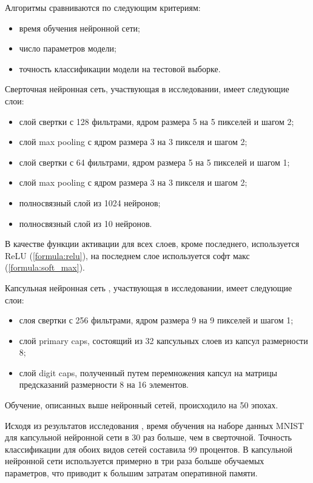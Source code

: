 Алгоритмы сравниваются по следующим критериям:
\begin{itemize}
	\item время обучения нейронной сети;
	\item число параметров модели;
	\item точность классификации модели на тестовой выборке.
\end{itemize}

Сверточная нейронная сеть, участвующая в исследовании, имеет следующие слои:
\begin{itemize}
	\item слой свертки с 128 фильтрами, ядром размера 5 на 5 пикселей и шагом 2;
	\item слой max pooling с ядром размера 3 на 3 пикселя и шагом 2;
	\item слой свертки с 64 фильтрами, ядром размера 5 на 5 пикселей и шагом 1;
	\item слой max pooling с ядром размера 3 на 3 пикселя и шагом 2;
	\item полносвязный слой из 1024 нейронов;
	\item полносвязный слой из 10 нейронов.
\end{itemize}
В качестве функции активации для всех слоев, кроме последнего, используется ReLU (\ref{formula:relu}), на последнем слое используется софт макс (\ref{formula:soft_max}).

Капсульная нейронная сеть , участвующая в исследовании, имеет следующие слои:
\begin{itemize}
	\item слоя свертки с 256 фильтрами, ядром размера 9 на 9 пикселей и шагом 1;
	\item слой primary caps, состоящий из 32 капсульных слоев из капсул размерности 8;
	\item слой digit caps, полученный путем перемножения капсул на матрицы предсказаний размерности 8 на 16 элементов.
\end{itemize}

Обучение, описанных выше нейронный сетей, происходило на 50 эпохах.

Исходя из результатов исследования \cite{comparising}, время обучения на наборе данных MNIST для капсульной нейронной сети в 30 раз больше, чем в сверточной. Точность классификации для обоих видов сетей составила 99 процентов. В капсульной нейронной сети используется примерно в три раза больше обучаемых параметров, что приводит к большим затратам оперативной памяти.

